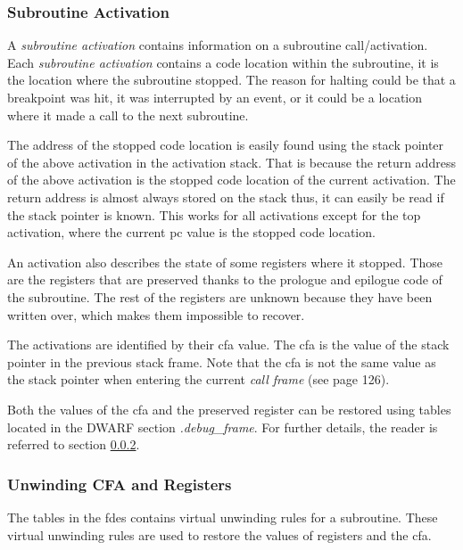 \subsubsection{Subroutine Activation} \label{sec:subact}
A \emph{subroutine activation} contains information on a subroutine call/activation.
Each \emph{subroutine activation} contains a code location within the subroutine, it is the location where the subroutine stopped.
The reason for halting could be that a breakpoint was hit, it was interrupted by an event, or it could be a location where it made a call to the next subroutine.


The address of the stopped code location is easily found using the stack pointer of the above activation in the activation stack.
That is because the return address of the above activation is the stopped code location of the current activation.
The return address is almost always stored on the stack thus, it can easily be read if the stack pointer is known.
This works for all activations except for the top activation, where the current \gls{pc} value is the stopped code location.


An activation also describes the state of some registers where it stopped.
Those are the registers that are preserved thanks to the prologue and epilogue code of the subroutine.
The rest of the registers are unknown because they have been written over, which makes them impossible to recover.


The activations are identified by their \gls{cfa} value. 
The \gls{cfa} is the value of the stack pointer in the previous stack frame.
Note that the \gls{cfa} is not the same value as the stack pointer when entering the current \emph{call frame} (see \cite{dwarf} page 126).


Both the values of the \gls{cfa} and the preserved register can be restored using tables located in the \gls{DWARF} section \emph{.debug\_frame}.
For further details, the reader is referred to section \ref{sec:evalcfa}.



\subsubsection{Unwinding CFA and Registers} \label{sec:evalcfa}
The tables in the \glspl{fde} contains virtual unwinding rules for a subroutine.
These virtual unwinding rules are used to restore the values of registers and the \gls{cfa}.


